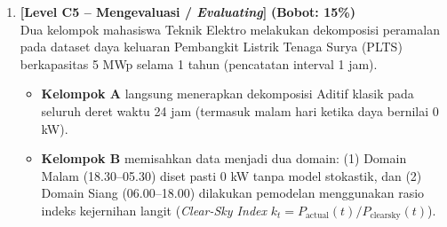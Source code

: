 \documentclass[11pt,a4paper]{article}
\begin{document}
\begin{enumerate}[leftmargin=1.5em, label=\textbf{Soal \arabic*.}]
    Hasil uji statistik pada residual $\hat{R}_t$ menunjukkan:
    \begin{itemize}
        \item Nilai rata-rata $\mu_{\hat{R}} = 0.002 \approx 0$
        \item Plot fungsi autokorelasi (ACF) dari $\hat{R}_t$ masih menunjukkan koefisien autokorelasi yang signifikan pada $lag = 12$ ($r_{12} = 0.42 > \frac{1.96}{\sqrt{N}}$) dan $lag = 24$ ($r_{24} = 0.38$).
        \item Terdapat 3 lonjakan magnitudo tajam ($> 4\sigma$) yang terjadi pada tanggal 12 dan 18.
    \end{itemize}

    \textbf{Pertanyaan Analisis:}
    \begin{enumerate}[label=\alph*.]
        \item Apakah komponen residual $\hat{R}_t$ di atas sudah memenuhi kriteria sebagai proses \textbf{White Noise}? Jelaskan analisis Anda berdasarkan 3 syarat matematis \textit{white noise}!
        \item Jelaskan interpretasi fisik kelistrikan mengenai penyebab munculnya autokorelasi pada $lag = 12$ dan $lag = 24$ pada residual tersebut!
        \item Apa rekomendasi perbaikan model dekomposisi yang harus dilakukan insinyur tersebut agar informasi periodik dapat terekstraksi secara tuntas?
    \end{enumerate}

    \newpage

    \item \textbf{[Level C5 -- Mengevaluasi / \textit{Evaluating}]} \hfill \textbf{(Bobot: 15\%)} \\
    Dua kelompok mahasiswa Teknik Elektro melakukan dekomposisi peramalan pada dataset daya keluaran Pembangkit Listrik Tenaga Surya (PLTS) berkapasitas 5 MWp selama 1 tahun (pencatatan interval 1 jam).
    \begin{itemize}
        \item \textbf{Kelompok A} langsung menerapkan dekomposisi Aditif klasik pada seluruh deret waktu 24 jam (termasuk malam hari ketika daya bernilai 0 kW).
        \item \textbf{Kelompok B} memisahkan data menjadi dua domain: (1) Domain Malam (18.30--05.30) diset pasti 0 kW tanpa model stokastik, dan (2) Domain Siang (06.00--18.00) dilakukan pemodelan menggunakan rasio indeks kejernihan langit (\textit{Clear-Sky Index} $k_t = P_{\text{actual}}(t) / P_{\text{clearsky}}(t)$).
    \end{itemize}


\end{enumerate}
\end{document}
